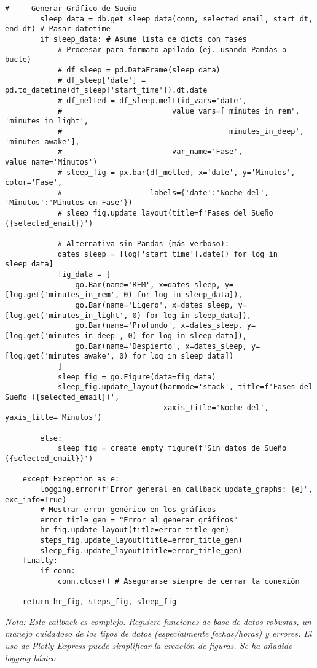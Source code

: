 \begin{lstlisting}[caption={Ejemplo de callback principal en Dash para actualizar gráficos.}, label={lst:dash_callback_code}]
        # --- Generar Gráfico de Sueño ---
        sleep_data = db.get_sleep_data(conn, selected_email, start_dt, end_dt) # Pasar datetime
        if sleep_data: # Asume lista de dicts con fases
            # Procesar para formato apilado (ej. usando Pandas o bucle)
            # df_sleep = pd.DataFrame(sleep_data)
            # df_sleep['date'] = pd.to_datetime(df_sleep['start_time']).dt.date
            # df_melted = df_sleep.melt(id_vars='date',
            #                         value_vars=['minutes_in_rem', 'minutes_in_light',
            #                                     'minutes_in_deep', 'minutes_awake'],
            #                         var_name='Fase', value_name='Minutos')
            # sleep_fig = px.bar(df_melted, x='date', y='Minutos', color='Fase',
            #                    labels={'date':'Noche del', 'Minutos':'Minutos en Fase'})
            # sleep_fig.update_layout(title=f'Fases del Sueño ({selected_email})')

            # Alternativa sin Pandas (más verboso):
            dates_sleep = [log['start_time'].date() for log in sleep_data]
            fig_data = [
                go.Bar(name='REM', x=dates_sleep, y=[log.get('minutes_in_rem', 0) for log in sleep_data]),
                go.Bar(name='Ligero', x=dates_sleep, y=[log.get('minutes_in_light', 0) for log in sleep_data]),
                go.Bar(name='Profundo', x=dates_sleep, y=[log.get('minutes_in_deep', 0) for log in sleep_data]),
                go.Bar(name='Despierto', x=dates_sleep, y=[log.get('minutes_awake', 0) for log in sleep_data])
            ]
            sleep_fig = go.Figure(data=fig_data)
            sleep_fig.update_layout(barmode='stack', title=f'Fases del Sueño ({selected_email})',
                                    xaxis_title='Noche del', yaxis_title='Minutos')

        else:
            sleep_fig = create_empty_figure(f'Sin datos de Sueño ({selected_email})')

    except Exception as e:
        logging.error(f"Error general en callback update_graphs: {e}", exc_info=True)
        # Mostrar error genérico en los gráficos
        error_title_gen = "Error al generar gráficos"
        hr_fig.update_layout(title=error_title_gen)
        steps_fig.update_layout(title=error_title_gen)
        sleep_fig.update_layout(title=error_title_gen)
    finally:
        if conn:
            conn.close() # Asegurarse siempre de cerrar la conexión

    return hr_fig, steps_fig, sleep_fig

\end{lstlisting}
\textit{Nota: Este callback es complejo. Requiere funciones de base de datos robustas, un manejo cuidadoso de los tipos de datos (especialmente fechas/horas) y errores. El uso de Plotly Express puede simplificar la creación de figuras. Se ha añadido logging básico.}